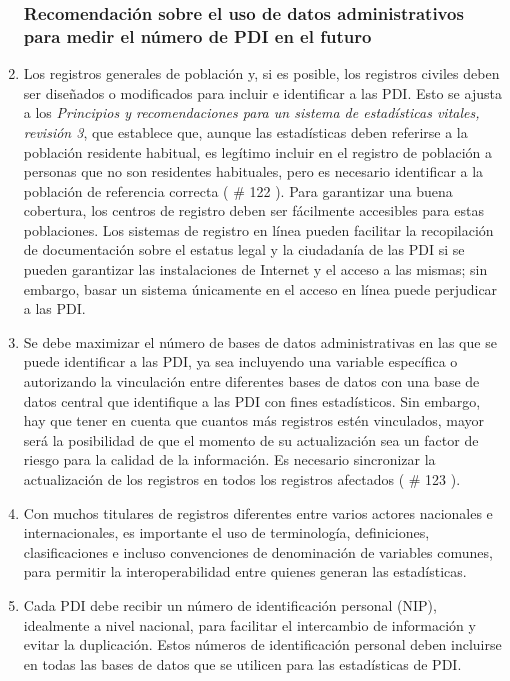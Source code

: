 \documentclass[
]{book}
\begin{document}
\begin{enumerate}
{  \subsubsection{Recomendación sobre el uso de datos administrativos para medir el número de PDI en el futuro}\label{recomendaciuxf3n-sobre-el-uso-de-datos-administrativos-para-medir-el-nuxfamero-de-pdi-en-el-futuro}}
\item
  Los registros generales de población y, si es posible, los registros civiles deben ser diseñados o modificados para incluir e identificar a las PDI. Esto se ajusta a los \emph{Principios y recomendaciones para un sistema de estadísticas vitales, revisión 3}, que establece que, aunque las estadísticas deben referirse a la población residente habitual, es legítimo incluir en el registro de población a personas que no son residentes habituales, pero es necesario identificar a la población de referencia correcta (
  \# 122
  ). Para garantizar una buena cobertura, los centros de registro deben ser fácilmente accesibles para estas poblaciones. Los sistemas de registro en línea pueden facilitar la recopilación de documentación sobre el estatus legal y la ciudadanía de las PDI si se pueden garantizar las instalaciones de Internet y el acceso a las mismas; sin embargo, basar un sistema únicamente en el acceso en línea puede perjudicar a las PDI.
\item
  Se debe maximizar el número de bases de datos administrativas en las que se puede identificar a las PDI, ya sea incluyendo una variable específica o autorizando la vinculación entre diferentes bases de datos con una base de datos central que identifique a las PDI con fines estadísticos. Sin embargo, hay que tener en cuenta que cuantos más registros estén vinculados, mayor será la posibilidad de que el momento de su actualización sea un factor de riesgo para la calidad de la información. Es necesario sincronizar la actualización de los registros en todos los registros afectados (
  \# 123
  ).
\item
  Con muchos titulares de registros diferentes entre varios actores nacionales e internacionales, es importante el uso de terminología, definiciones, clasificaciones e incluso convenciones de denominación de variables comunes, para permitir la interoperabilidad entre quienes generan las estadísticas.
\item
  Cada PDI debe recibir un número de identificación personal (NIP), idealmente a nivel nacional, para facilitar el intercambio de información y evitar la duplicación. Estos números de identificación personal deben incluirse en todas las bases de datos que se utilicen para las estadísticas de PDI.

\end{enumerate}
\end{document}
